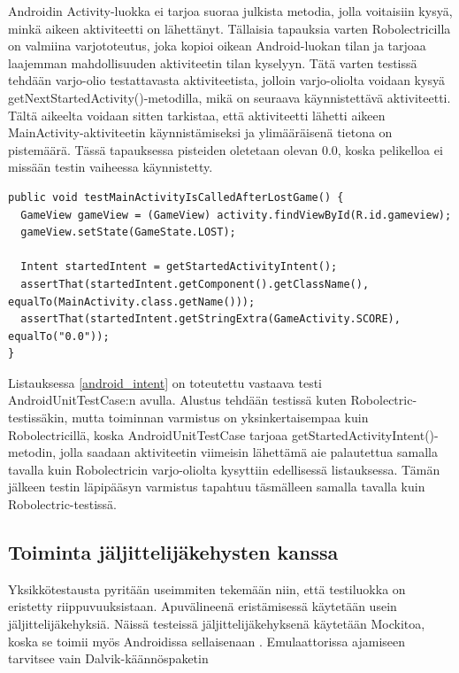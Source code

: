 Androidin Activity-luokka ei tarjoa suoraa julkista metodia, jolla voitaisiin kysyä, minkä aikeen aktiviteetti on lähettänyt. Tällaisia tapauksia varten Robolectricilla on valmiina varjototeutus, joka kopioi oikean Android-luokan tilan ja tarjoaa laajemman mahdollisuuden aktiviteetin tilan kyselyyn. Tätä varten testissä tehdään varjo-olio testattavasta aktiviteetista, jolloin varjo-oliolta voidaan kysyä getNextStartedActivity()-metodilla, mikä on seuraava käynnistettävä aktiviteetti. Tältä aikeelta voidaan sitten tarkistaa, että aktiviteetti lähetti aikeen MainActivity-aktiviteetin käynnistämiseksi ja ylimääräisenä tietona on pistemäärä. Tässä tapauksessa pisteiden oletetaan olevan 0.0, koska pelikelloa ei missään testin vaiheessa käynnistetty.

\begin{lstlisting}[float,label=android_intent,caption=Aikeen tilatietojen tarkastelu ActivityUnitTestCasen avulla]
public void testMainActivityIsCalledAfterLostGame() {
  GameView gameView = (GameView) activity.findViewById(R.id.gameview);
  gameView.setState(GameState.LOST);
  	
  Intent startedIntent = getStartedActivityIntent();
  assertThat(startedIntent.getComponent().getClassName(), equalTo(MainActivity.class.getName()));
  assertThat(startedIntent.getStringExtra(GameActivity.SCORE), equalTo("0.0"));
}
\end{lstlisting}

Listauksessa \ref{android_intent} on toteutettu vastaava testi AndroidUnitTestCase:n avulla. Alustus tehdään testissä kuten Robolectric-testissäkin, mutta toiminnan varmistus on yksinkertaisempaa kuin Robolectricillä, koska AndroidUnitTestCase tarjoaa getStartedActivityIntent()-metodin, jolla saadaan aktiviteetin viimeisin lähettämä aie palautettua samalla tavalla kuin Robolectricin varjo-oliolta kysyttiin edellisessä listauksessa. Tämän jälkeen testin läpipääsyn varmistus tapahtuu täsmälleen samalla tavalla kuin Robolectric-testissä.

\subsection{Toiminta jäljittelijäkehysten kanssa}

Yksikkötestausta pyritään useimmiten tekemään niin, että testiluokka on eristetty riippuvuuksistaan. Apuvälineenä eristämisessä käytetään usein jäljittelijäkehyksiä. Näissä testeissä jäljittelijäkehyksenä käytetään Mockitoa, koska se toimii myös Androidissa sellaisenaan \cite{mockito}. Emulaattorissa ajamiseen tarvitsee vain Dalvik-käännöspaketin

